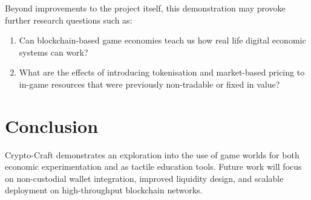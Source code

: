 \documentclass[conference]{IEEEtran}
\begin{document}
Beyond improvements to the project itself, this demonstration may provoke further research questions such as:
\begin{enumerate}
\item Can blockchain-based game economies teach us how real life digital economic systems can work?
\item What are the effects of introducing tokenisation and market-based pricing to in-game resources that were previously non-tradable or fixed in value?
\end{enumerate}



\section{Conclusion}
Crypto-Craft demonstrates an exploration into the use of game worlds for both economic experimentation and as tactile education tools. Future work will focus on non-custodial wallet integration, improved liquidity design, and scalable deployment on high-throughput blockchain networks.



\end{document}

